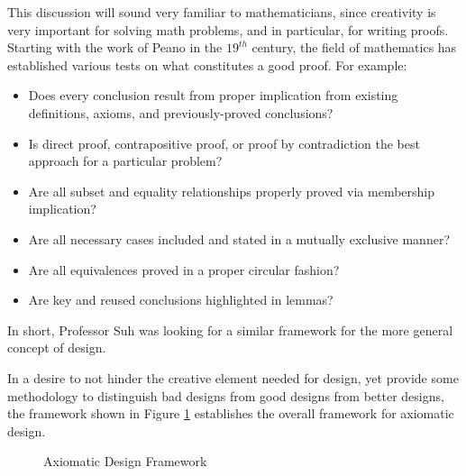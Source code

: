 This discussion will sound very familiar to mathematicians, since creativity is very important for solving math
problems, and in particular, for writing proofs.  Starting with the work of Peano in the \(19^{th}\) century, the
field of mathematics has established various tests on what constitutes a good proof.  For example:
\begin{itemize}
\item Does every conclusion result from proper implication from existing definitions, axioms, and previously-proved
  conclusions?
\item Is direct proof, contrapositive proof, or proof by contradiction the best approach for a particular problem?
\item Are all subset and equality relationships properly proved via membership implication?
\item Are all necessary cases included and stated in a mutually exclusive manner?
\item Are all equivalences proved in a proper circular fashion?
\item Are key and reused conclusions highlighted in lemmas?
\end{itemize}
In short, Professor Suh was looking for a similar framework for the more general concept of design.

In a desire to not hinder the creative element needed for design, yet provide some methodology to distinguish bad
designs from good designs from better designs, the framework shown in Figure \ref{fig:design} establishes the
overall framework for axiomatic design.

\begin{figure}[h]
  \label{fig:design}
  \begin{center}
  \end{center}
  \caption{Axiomatic Design Framework}
\end{figure}

